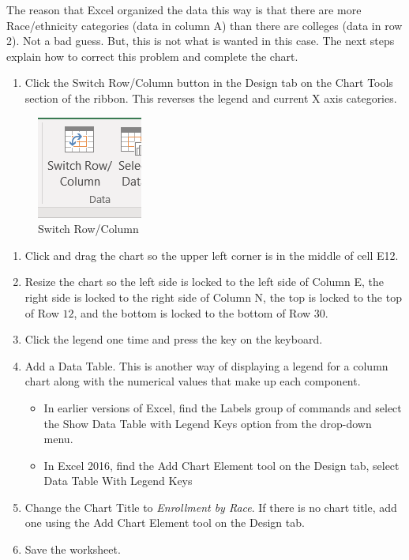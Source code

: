 The reason that Excel organized the data this way is that there are more Race/ethnicity categories (data in column A) than there are colleges (data in row 2). Not a bad guess. But, this is not what is wanted in this case. The next steps explain how to correct this problem and complete the chart.

\begin{enumerate}
	\item Click the Switch Row/Column button in the Design tab on the Chart Tools section of the ribbon. This reverses the legend and current X axis categories.
\end{enumerate}

\begin{figure}[H]
	\centering
	\includegraphics[width=\maxwidth{.95\linewidth}]{gfx/ch04_fig25}
	\caption{Switch Row/Column}
	\label{04:fig25}
\end{figure}

\begin{enumerate}[resume]
	\item Click and drag the chart so the upper left corner is in the middle of cell \textsf{E12}.
	\item Resize the chart so the left side is locked to the left side of Column E, the right side is locked to the right side of Column N, the top is locked to the top of Row $ 12 $, and the bottom is locked to the bottom of Row $ 30 $.
	\item Click the legend one time and press the  key on the keyboard.
	\item Add a Data Table. This is another way of displaying a legend for a column chart along with the numerical values that make up each component.

	\begin{itemize}
		\item In earlier versions of Excel, find the Labels group of commands and select the Show Data Table with Legend Keys option from the drop-down menu.
		\item In Excel 2016, find the Add Chart Element tool on the Design tab, select Data Table With Legend Keys
	\end{itemize}

	\item Change the Chart Title to \textit{Enrollment by Race}. If there is no chart title, add one using the Add Chart Element tool on the Design tab.
	\item Save the worksheet.
\end{enumerate}

